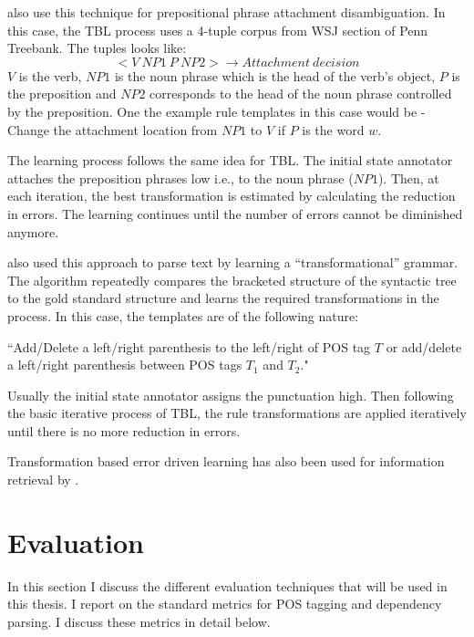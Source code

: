 \citet{brill1994rule} also use this technique for prepositional phrase attachment disambiguation. In this case, the TBL process uses a 4-tuple corpus from WSJ section of Penn Treebank. The tuples looks like: $$<V\ NP1\ P\ NP2> \rightarrow Attachment\ decision$$
$V$ is the verb, $NP1$ is the noun phrase which is the head of the verb's object, $P$ is the preposition and $NP2$ corresponds to the head of the noun phrase controlled by the preposition. One the example rule templates in this case would be - \\
Change the attachment location from $NP1$ to $V$ if $P$ is the word $w$.

The learning process follows the same idea for TBL. The initial state annotator attaches the preposition phrases low i.e., to the noun phrase ($NP1$). Then, at each iteration, the best transformation is estimated by calculating the reduction in errors. The learning continues until the number of errors cannot be diminished anymore.

\citet{brill1993automatic} also used this approach to parse text by learning a ``transformational'' grammar. The algorithm repeatedly compares the bracketed structure of the syntactic tree to the gold standard structure and learns the required transformations in the process. In this case, the templates are of the following nature:

``Add/Delete a left/right parenthesis to the left/right of POS tag $T$ or add/delete a left/right parenthesis between POS tags $T_1$ and $T_2$."

Usually the initial state annotator assigns the punctuation high. Then following the basic iterative process of TBL, the rule transformations are applied iteratively until there is no more reduction in errors. 

Transformation based error driven learning has also been used for information retrieval by \citet{woodley2005applying}.






\section{Evaluation}


In this section I discuss the different evaluation techniques that will be used in this thesis. I report on the standard metrics for POS tagging and dependency parsing. I discuss these metrics in detail below.


